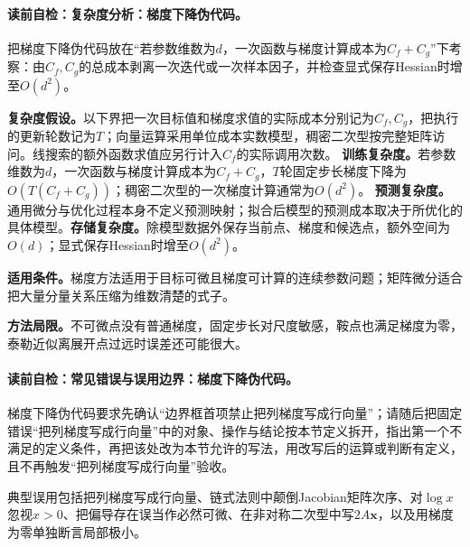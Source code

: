 \paragraph{读前自检：复杂度分析：梯度下降伪代码。}把梯度下降伪代码放在“若参数维数为$d$，一次函数与梯度计算成本为$C_f+C_g$”下考察：由$C_f,C_g$的总成本剥离一次迭代或一次样本因子，并检查显式保存Hessian时增至$O(d^2)$。\par

\begin{complexitybox}
\textbf{复杂度假设。}以下界把一次目标值和梯度求值的实际成本分别记为$C_f,C_g$，把执行的更新轮数记为$T$；向量运算采用单位成本实数模型，稠密二次型按完整矩阵访问。线搜索的额外函数求值应另行计入$C_f$的实际调用次数。
\label{schema:V1-C03:CH-26}
\textbf{训练复杂度。}若参数维数为$d$，一次函数与梯度计算成本为$C_f+C_g$，$T$轮固定步长梯度下降为$O(T(C_f+C_g))$；稠密二次型的一次梯度计算通常为$O(d^2)$。
\label{schema:V1-C03:CH-27}
\textbf{预测复杂度。}通用微分与优化过程本身不定义预测映射；拟合后模型的预测成本取决于所优化的具体模型。\textbf{存储复杂度。}除模型数据外保存当前点、梯度和候选点，额外空间为$O(d)$；显式保存Hessian时增至$O(d^2)$。
\end{complexitybox}
\begin{applicabilitybox}\label{schema:V1-C03:CH-28}
\textbf{适用条件。}梯度方法适用于目标可微且梯度可计算的连续参数问题；矩阵微分适合把大量分量关系压缩为维数清楚的式子。\par
{}\label{schema:V1-C03:CH-29}
\textbf{方法局限。}不可微点没有普通梯度，固定步长对尺度敏感，鞍点也满足梯度为零，泰勒近似离展开点过远时误差还可能很大。
\end{applicabilitybox}
\paragraph{读前自检：常见错误与误用边界：梯度下降伪代码。}梯度下降伪代码要求先确认“边界框首项禁止把列梯度写成行向量”；请随后把固定错误“把列梯度写成行向量”中的对象、操作与结论按本节定义拆开，指出第一个不满足的定义条件，再把该处改为本节允许的写法，用改写后的运算或判断有定义，且不再触发“把列梯度写成行向量”验收。\par

\begin{warningbox}\label{schema:V1-C03:CH-30}
典型误用包括把列梯度写成行向量、链式法则中颠倒Jacobian矩阵次序、对$\log x$忽视$x>0$、把偏导存在误当作必然可微、在非对称二次型中写$2A\boldsymbol{x}$，以及用梯度为零单独断言局部极小。
\end{warningbox}

